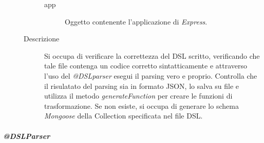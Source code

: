 \begin{description}
\begin{mldescription}
\begin{description}
    			\begin{description}
    				\item[app]
    				Oggetto contenente l'applicazione di \textit{Express}.
    			\end{description}
    		\item[Descrizione]
    		Si occupa di verificare la correttezza del DSL scritto, verificando che tale file contenga un codice corretto sintatticamente e attraverso l'uso del \textit{@DSLparser} esegui il parsing vero e proprio. Controlla che il risulatato del parsing sia in formato JSON, lo salva su file e utilizza il metodo \textit{generateFunction} per creare le funzioni di trasformazione. Se non esiste, si occupa di generare lo schema \textit{Mongoose} della Collection specificata nel file DSL.
    \end{description}
 \end{mldescription}
 
\end{description}
\subparagraph{@DSLParser}
